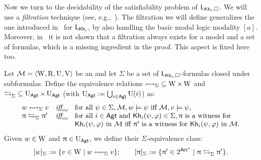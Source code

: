 
Now we turn to the decidability of the satisfiability problem of $\mathsf{L}_{{\sf Kh}_i,\square}$. We will use a \emph{filtration} technique (see, e.g.,~\cite{mlbook}). 
The filtration we will define generalizes the one introduced in~\cite{AFSVQ23report} for $\mathsf{L}_{{\sf Kh}_i}$, by also handling the basic modal logic modality $[a]$. Moreover, in~\cite{AFSVQ23report} it is not shown that a filtration always exists for a model and a set of formulas, which is a missing ingredient in the proof. This aspect is fixed here too.


\medskip

\begin{definition}
Let $\mathcal{M}=\langle \operatorname{W},\operatorname{R},\operatorname{U},\operatorname{V} \rangle$ be an \ults and let $\Sigma$ be a set of $\mathsf{L}_{{\sf Kh}_i,\square}$-formulas closed under subformulas.
Define the equivalence relations ${\leftrightsquigarrow_\Sigma} \subseteq \operatorname{W}\times\operatorname{W}$ and ${\mathrel{\leftrightarrows}_\Sigma} \subseteq \operatorname{U}_{\rm \sf Agt} \times \operatorname{U}_{\rm \sf Agt}$ (with $\operatorname{U}_{\rm \sf Agt} := \bigcup_{i \in {\rm \sf Agt}}\operatorname{U}(i)$) as:
$$\begin{array}{lcl}
w \leftrightsquigarrow_\Sigma v &  \mbox{\it iff}_{\mbox{\tiny\it def}} &
\text{for all } \psi \in \Sigma, \mathcal{M},w\models \psi \text{ iff } \mathcal{M},v\models \psi,\\
\uppi \mathrel{\leftrightarrows}_\Sigma \uppi' & \mbox{\it iff}_{\mbox{\tiny\it def}} &
\text{for all } i \in {\rm \sf Agt} \text{ and } {\sf Kh}_i(\psi,\varphi) \in \Sigma,  \uppi \text{ is a witness for }\\ 
& & {\sf Kh}_i(\psi,\varphi) \text{ in } \mathcal{M} \text{ iff } \uppi' \text{ is a witness for } {\sf Kh}_i(\psi,\varphi) \text{ in } \mathcal{M}.
\end{array}
$$
Given $w \in \operatorname{W}$ and $\uppi \in \operatorname{U}_{\rm \sf Agt}$, we define their $\Sigma$-equivalence class:
\[
[w]_\Sigma := \{ v \in \operatorname{W} \mid w \leftrightsquigarrow_\Sigma v \}; \qquad  [\uppi]_\Sigma := \{ \uppi' \in 2^{{\rm \sf Act}^*} \mid \uppi \mathrel{\leftrightarrows}_\Sigma \uppi' \}.
\]
\end{definition}



